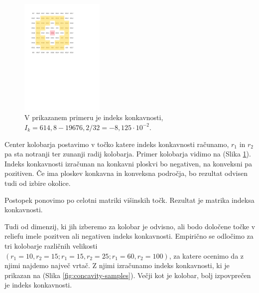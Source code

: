 \documentclass[a4paper, twoside, 12pt]{book}
\begin{document}
  \begin{figure}[h!]
    \begin{center}
      \includegraphics[width=4cm]{slike/concavity-ring-visualisation-2}
    \end{center}
    \caption{V prikazanem primeru je indeks konkavnosti, $I_k = 614,8 - 19676,2/32 = - 8,125 \cdot 10^{-2}$.}
    \label{fig:concavity-ring}
  \end{figure}

Center kolobarja postavimo v točko katere indeks konkavnosti računamo, $r_1$ in $r_2$ pa sta notranji ter zunanji radij kolobarja.
Primer kolobarja vidimo na (Slika \ref{fig:concavity-ring}). Indeks konkavnosti izračunan na konkavni ploskvi bo negativen, na konveksni pa pozitiven. Če ima ploskev konkavna in konveksna področja, bo rezultat odvisen tudi od izbire okolice.

Postopek ponovimo po celotni matriki višinskih točk. Rezultat je matrika indeksa konkavnosti.

Tudi od dimenzij, ki jih izberemo za kolobar je odvisno, ali bodo določene točke v reliefu imele pozitven ali negativen indeks konkavnosti. Empirično se odločimo za tri kolobarje različnih velikosti $(r_1=10,r_2=15;r_1=15,r_2=25;r_1=60,r_2=100)$, za katere ocenimo da z njimi najdemo največ vrtač. Z njimi izračunamo indeks konkavnosti, ki je prikazan na (Slika \ref{fig:concavity-samples}). Večji kot je kolobar, bolj izpovprečen je indeks konkavnosti.
\end{document}
